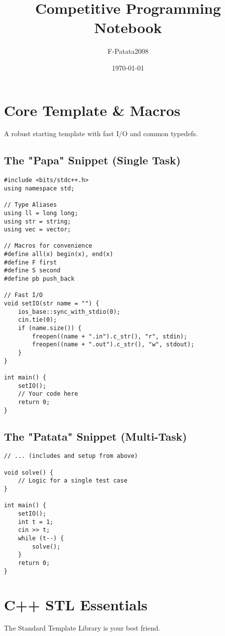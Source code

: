 \documentclass[10pt]{article}
\title{\Huge\bfseries Competitive Programming Notebook}
\author{\large F-Patata2008}
\date{\today}
\begin{document}
\columnsep=1cm
\begin{multicols}{2} %

\maketitle
\tableofcontents
\newpage

\section{Core Template \& Macros}
A robust starting template with fast I/O and common typedefs.

\subsection{The "Papa" Snippet (Single Task)}
\begin{lstlisting}
#include <bits/stdc++.h>
using namespace std;

// Type Aliases
using ll = long long;
using str = string;
using vec = vector;

// Macros for convenience
#define all(x) begin(x), end(x)
#define F first
#define S second
#define pb push_back

// Fast I/O
void setIO(str name = "") {
    ios_base::sync_with_stdio(0);
    cin.tie(0);
    if (name.size()) {
        freopen((name + ".in").c_str(), "r", stdin);
        freopen((name + ".out").c_str(), "w", stdout);
    }
}

int main() {
    setIO();
    // Your code here
    return 0;
}
\end{lstlisting}

\subsection{The "Patata" Snippet (Multi-Task)}
\begin{lstlisting}
// ... (includes and setup from above)

void solve() {
    // Logic for a single test case
}

int main() {
    setIO();
    int t = 1;
    cin >> t;
    while (t--) {
        solve();
    }
    return 0;
}
\end{lstlisting}

\section{C++ STL Essentials}
The Standard Template Library is your best friend.


\end{multicols}
\end{document}
